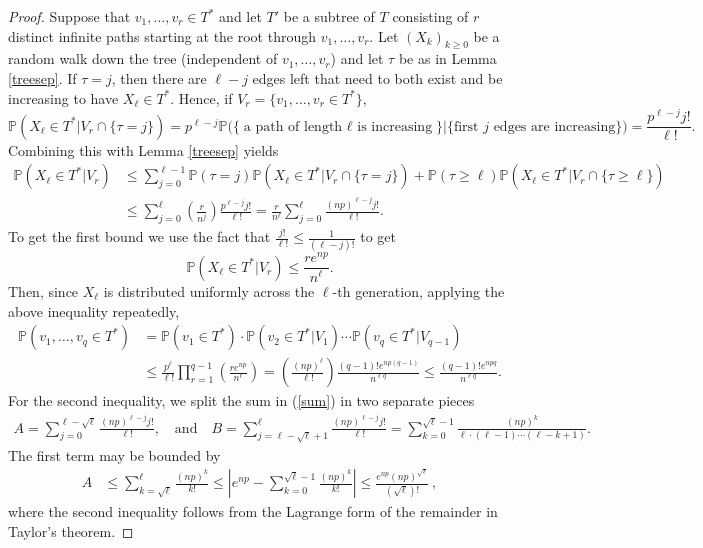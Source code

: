 \documentclass[11pt]{article}
\newcommand{\1}{\mathbf{1}} %
\newcommand{\prob}{\mathbb{P}} %
\begin{document}
\begin{proof}
Suppose that $v_1,\ldots,v_r \in T^*$ and let $T'$ be a subtree of $T$ consisting of $r$ distinct infinite paths starting at the root through $v_1,\ldots,v_r$. Let $(X_k)_{k \geq 0}$ be a random walk down the tree (independent of $v_1,\ldots,v_r$) and let $\tau$ be as in Lemma \ref{treesep}. If $\tau = j$, then there are $\ell-j$ edges left that need to both exist and be increasing to have $X_\ell \in T^*$. Hence, if $V_r = \{v_1 , \ldots , v_r \in T^*\}$,
$$\prob(X_\ell \in T^* | V_r \cap \{\tau = j\}) = p^{\ell-j}\prob\big(\big\{\text{a path of length $\ell$ is increasing}\big\} \big|\big\{ \text{first $j$ edges are increasing}\big\}\big) = \frac{p^{\ell-j}j!}{\ell!}.$$
Combining this with Lemma \ref{treesep} yields
\begin{align}\label{sum}
\prob(X_\ell \in T^* | V_r)  &
\leq \sum_{j=0}^{\ell-1} \prob(\tau = j)\prob(X_\ell \in T^* | V_r \cap \{\tau = j\}) 
+ \prob(\tau \ge \ell)\prob(X_\ell \in T^* | V_r \cap \{\tau \ge \ell\}) 
 \nonumber \\
& \leq \sum_{j=0}^\ell \left(\frac{r}{n^j}\right)\frac{p^{\ell-j}j!}{\ell!} = \frac{r}{n^\ell}\sum_{j=0}^\ell\frac{(np)^{\ell-j}j!}{\ell!}.
\end{align}
To get the first bound we use the fact that $\frac{j!}{\ell!} \leq \frac{1}{(\ell-j)!}$ to get 
$$\prob(X_\ell \in T^*|V_r) \leq \frac{re^{np}}{n^\ell}.$$
Then, since $X_\ell$ is distributed uniformly across the $\ell$-th generation,  applying the above inequality repeatedly,
\begin{align*}
\prob(v_1,\ldots,v_q \in T^*) &= \prob(v_1 \in T^*) \cdot \prob(v_2 \in T^* | V_1) \cdots \prob(v_q \in T^* | V_{q-1}) \\
&\leq \frac{p^\ell}{\ell!}\prod_{r=1}^{q-1}\left(\frac{re^{np}}{n^\ell}\right) = \left(\frac{(np)^{\ell}}{\ell!}\right)\frac{(q-1)!e^{np(q-1)}}{n^{\ell q}} \leq \frac{(q-1)!e^{npq}}{n^{\ell q}}.
\end{align*} 
For the second inequality, we split the sum in (\ref{sum}) in two separate pieces
\begin{align*}
    A = \sum_{j=0}^{\ell - \sqrt{\ell}}\frac{(np)^{\ell - j}j!}{\ell!}, \quad \text{and} \quad B = \sum_{j=\ell -\sqrt{\ell}+1}^\ell \frac{(np)^{\ell-j}j!}{\ell!} = \sum_{k=0}^{\sqrt{\ell}-1} \frac{(np)^k}{\ell \cdot (\ell-1) \cdots (\ell-k+1)}.
\end{align*}
The first term may be bounded by
\begin{align*}
A &\leq \sum_{k=\sqrt{\ell}}^\ell \frac{(np)^k}{k!} \leq \left|e^{np}- \sum_{k=0}^{\sqrt{\ell}-1} \frac{(np)^k}{k!}\right| \leq \frac{e^{np}(np)^{\sqrt{\ell}}}{(\sqrt{\ell})!}~,
\end{align*}
where the second inequality follows from the Lagrange form of the remainder in Taylor's theorem.


\end{proof}
\end{document}
